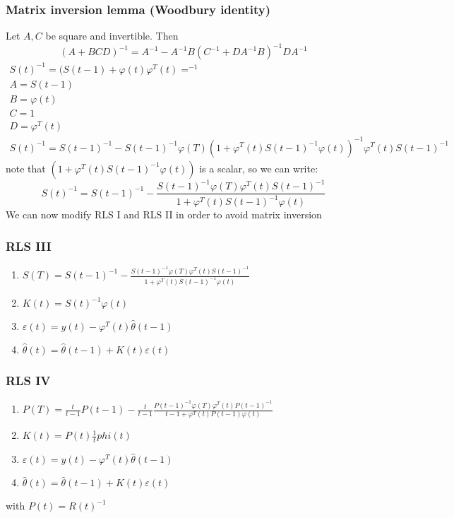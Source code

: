 \documentclass{book}
\begin{document}
\subsubsection{Matrix inversion lemma (Woodbury identity)}
Let $A,C$ be square and invertible. Then
\[
    (A+BCD)^{-1}=A^{-1}-A^{-1}B(C^{-1}+DA^{-1}B)^{-1}DA^{-1}
\]
\begin{gather*}
    S(t)^{-1}=(S(t-1)+\varphi(t)\varphi^T(t)=^{-1}\\
    A=S(t-1)\\
    B=\varphi(t)\\
    C=1\\
    D=\varphi^T(t)\\
    S(t)^{-1}=S(t-1)^{-1}-S(t-1)^{-1}\varphi(T)(1+\varphi^T(t)S(t-1)^{-1}\varphi(t))^{-1}\varphi^T(t)S(t-1)^{-1}
\end{gather*}
note that $(1+\varphi^T(t)S(t-1)^{-1}\varphi(t))$ is a scalar, so we can write:
\[
    S(t)^{-1}=S(t-1)^{-1}-\frac{S(t-1)^{-1}\varphi(T)\varphi^T(t)S(t-1)^{-1}}{1+\varphi^T(t)S(t-1)^{-1}\varphi(t)}
\]
We can now modify RLS I and RLS II in order to avoid matrix inversion
\subsubsection{RLS III}
\begin{enumerate}
    \item $S(T) = S(t-1)^{-1}-\frac{S(t-1)^{-1}\varphi(T)\varphi^T(t)S(t-1)^{-1}}{1+\varphi^T(t)S(t-1)^{-1}\varphi(t)}
$
    \item $K(t) = S(t)^{-1}\varphi(t)$
    \item $\varepsilon(t)=y(t)-\varphi^T(t)\hat{\theta}(t-1)$
    \item $\hat{\theta}(t)=\hat{\theta}(t-1)+K(t)\varepsilon(t)$
\end{enumerate}
\subsubsection{RLS IV}
\begin{enumerate}
    \item $P(T) =\frac{t}{t-1} P(t-1)-\frac{t}{t-1}\frac{P(t-1)^{-1}\varphi(T)\varphi^T(t)P(t-1)^{-1}}{t-1+\varphi^T(t)P(t-1)\varphi(t)}
$
\item $K(t) = P(t)\frac{1}{t}phi(t)$
    \item $\varepsilon(t)=y(t)-\varphi^T(t)\hat{\theta}(t-1)$
    \item $\hat{\theta}(t)=\hat{\theta}(t-1)+K(t)\varepsilon(t)$
\end{enumerate}
with $P(t)=R(t)^{-1}$
\end{document}
